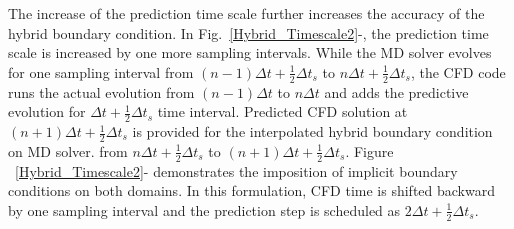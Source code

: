 \documentclass[preprint,12pt]{elsarticle}
\begin{document}

The increase of the prediction time scale further increases the accuracy
of the hybrid boundary condition.
In Fig.~\ref{Hybrid_Timescale2}-, the prediction
time scale is increased by one more sampling intervals. While the MD
solver evolves for one sampling interval
from $(n-1){\Delta}t + \frac{1}{2}{\Delta}{t_s}$ to $n{\Delta}t + \frac{1}{2}{\Delta}{t_s}$,
the CFD code runs the actual evolution from $(n-1){\Delta}t$ to $n{\Delta}t$
and adds the predictive evolution for ${\Delta}t + \frac{1}{2}{\Delta}{t_s}$ time
interval. Predicted CFD solution at $(n+1){\Delta}t + \frac{1}{2}{\Delta}{t_s}$
is provided for the interpolated hybrid boundary condition on MD solver.
from $n{\Delta}t + \frac{1}{2}{\Delta}{t_s}$ to $(n+1){\Delta}t + \frac{1}{2}{\Delta}{t_s}$.
Figure ~\ref{Hybrid_Timescale2}- demonstrates the
imposition of implicit boundary conditions on both domains. In this formulation,
CFD time is shifted backward by one sampling interval and the prediction step
is scheduled as $2{\Delta}t + \frac{1}{2}{\Delta}{t_s}$.


\end{document}
